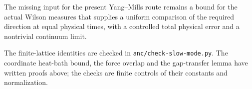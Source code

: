 The missing input for the present Yang--Mills route remains a
bound for the actual Wilson measures that supplies a uniform
comparison of the required direction at equal physical times,
with a controlled total physical error and a nontrivial
continuum limit.

The finite-lattice identities are checked in \texttt{anc/check-slow-mode.py}. The coordinate heat-bath bound, the force overlap and the gap-transfer lemma have written proofs above; the checks are finite controls of their constants and normalization.
